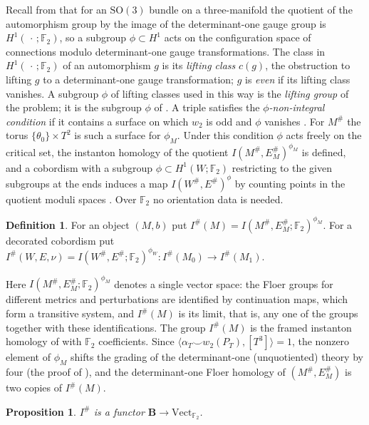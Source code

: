 \documentclass[11pt]{amsart}
\newtheorem{proposition}[theorem]{Proposition}
\theoremstyle{definition}
\newtheorem{definition}[theorem]{Definition}
\theoremstyle{remark}
\theoremstyle{plain}
\numberwithin{equation}{section}
\newcommand{\FF}{\mathbb{F}_2}
\newcommand{\bB}{\mathbf{B}}
\newcommand{\SO}{\mathrm{SO}}
\newcommand{\Ish}{I^{\#}}
\begin{document}
Recall from \cite[Section~5.1]{KM-unknot} that for an $\SO(3)$ bundle on
a three-manifold the quotient of the automorphism group by the image of
the determinant-one gauge group is $H^1(\,\cdot\,;\FF)$, so a subgroup
$\phi\subset H^1$ acts on the configuration space of connections modulo
determinant-one gauge transformations. The class in $H^1(\,\cdot\,;\FF)$ of an automorphism $g$ is
its \emph{lifting class} $c(g)$, the obstruction to lifting $g$ to a
determinant-one gauge transformation; $g$ is \emph{even} if its lifting class vanishes. A subgroup $\phi$ of lifting classes used in this way is the
\emph{lifting group} of the problem; it is the subgroup $\phi$ of \cite[Section~5.1]{KM-unknot}. A triple satisfies the
\emph{$\phi$-non-integral condition} if it contains a surface on which
$w_2$ is odd and $\phi$ vanishes \cite[Definition~5.1]{KM-unknot}. For
$M^\#$ the torus $\{\theta_0\}\times T^2$ is such a surface for
$\phi_M$. Under this condition $\phi$ acts freely on the critical set,
the instanton homology of the quotient $I(M^\#,E^\#_M)^{\phi_M}$ is
defined, and a cobordism with a subgroup $\phi\subset H^1(W;\FF)$
restricting to the given subgroups at the ends induces a map
$I(W^\#,E^\#)^{\phi}$ by counting points in the quotient moduli spaces
\cite[pp.~154--155]{KM-unknot}. Over $\FF$ no orientation data is
needed.

\begin{definition}\label{def:Ish}
For an object $(M,b)$ put $\Ish(M)=I(M^\#,E^\#_M;\FF)^{\phi_M}$. For a
decorated cobordism put
$\Ish(W,E,\nu)=I(W^\#,E^\#;\FF)^{\phi_W}\colon\Ish(M_0)\to\Ish(M_1)$.
\end{definition}

Here $I(M^\#,E^\#_M;\FF)^{\phi_M}$ denotes a single vector space: the Floer
groups for different metrics and perturbations are identified by continuation
maps, which form a transitive system, and $\Ish(M)$ is its limit, that is, any
one of the groups together with these identifications.
The group $\Ish(M)$ is the framed instanton homology of
\cite{KM-unknot, Scaduto} with $\FF$ coefficients. Since
$\langle\alpha_T\smile w_2(P_T),[T^3]\rangle=1$, the nonzero element of
$\phi_M$ shifts the grading of the determinant-one (unquotiented) theory by four
(the proof of \cite[Proposition~5.2(a)]{KM-unknot}), and the determinant-one Floer
homology of $(M^\#,E^\#_M)$ is two copies of $\Ish(M)$.

\begin{proposition}\label{prop:gauge-functor}
$\Ish$ is a functor $\bB\to\mathrm{Vect}_{\FF}$.
\end{proposition}
\end{document}
